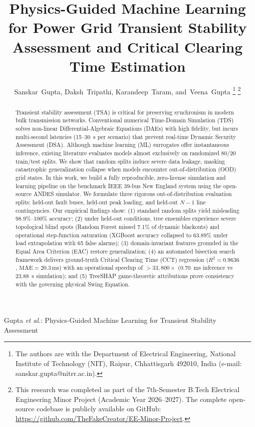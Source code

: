 \documentclass[journal]{IEEEtran}
\begin{document}
\title{Physics-Guided Machine Learning for Power Grid Transient Stability Assessment and Critical Clearing Time Estimation}

\author{Sanskar~Gupta,
        Daksh~Tripathi,
        Karandeep~Taram,
        and~Veena~Gupta%
\thanks{The authors are with the Department of Electrical Engineering, National Institute of Technology (NIT), Raipur, Chhattisgarh 492010, India (e-mail: sanskar.gupta@nitrr.ac.in).}%
\thanks{This research was completed as part of the 7th-Semester B.Tech Electrical Engineering Minor Project (Academic Year 2026--2027). The complete open-source codebase is publicly available on GitHub: \protect\url{https://github.com/TheFakeCreator/EE-Minor-Project}.}}

%
{Gupta \MakeLowercase{\textit{et al.}}: Physics-Guided Machine Learning for Transient Stability Assessment}

\maketitle

\begin{abstract}
Transient stability assessment (TSA) is critical for preserving synchronism in modern bulk transmission networks. Conventional numerical Time-Domain Simulation (TDS) solves non-linear Differential-Algebraic Equations (DAEs) with high fidelity, but incurs multi-second latencies (15--30~s per scenario) that prevent real-time Dynamic Security Assessment (DSA). Although machine learning (ML) surrogates offer instantaneous inference, existing literature evaluates models almost exclusively on randomized 80/20 train/test splits. We show that random splits induce severe data leakage, masking catastrophic generalization collapse when models encounter out-of-distribution (OOD) grid states. In this work, we build a fully reproducible, zero-license simulation and learning pipeline on the benchmark IEEE 39-bus New England system using the open-source ANDES simulator. We formulate three rigorous out-of-distribution evaluation splits: held-out fault buses, held-out peak loading, and held-out $N-1$ line contingencies. Our empirical findings show: (1) standard random splits yield misleading 98.9\%--100\% accuracy; (2) under held-out conditions, tree ensembles experience severe topological blind spots (Random Forest missed 7.1\% of dynamic blackouts) and operational step-function saturation (XGBoost accuracy collapsed to 63.89\% under load extrapolation with 65 false alarms); (3) domain-invariant features grounded in the Equal Area Criterion (EAC) restore generalization; (4) an automated bisection search framework delivers ground-truth Critical Clearing Time (CCT) regression ($R^2 = 0.9636$, $\text{MAE} = 20.3\,\text{ms}$) with an operational speedup of $>33,800\times$ (0.70~ms inference vs 23.88~s simulation); and (5) TreeSHAP game-theoretic attributions prove consistency with the governing physical Swing Equation.
\end{abstract}
\end{document}
